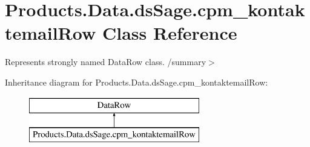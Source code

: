 \hypertarget{class_products_1_1_data_1_1ds_sage_1_1cpm__kontaktemail_row}{}\section{Products.\+Data.\+ds\+Sage.\+cpm\+\_\+kontaktemail\+Row Class Reference}
\label{class_products_1_1_data_1_1ds_sage_1_1cpm__kontaktemail_row}


Represents strongly named Data\+Row class. /summary$>$  


Inheritance diagram for Products.\+Data.\+ds\+Sage.\+cpm\+\_\+kontaktemail\+Row\+:\begin{figure}[H]
\begin{center}
\leavevmode
\includegraphics[height=2.000000cm]{class_products_1_1_data_1_1ds_sage_1_1cpm__kontaktemail_row}
\end{center}
\end{figure}
